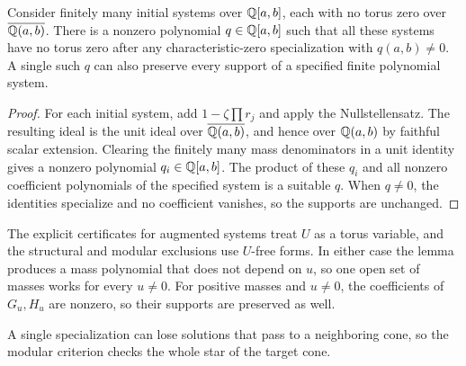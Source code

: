 \documentclass[11pt]{amsart}
\theoremstyle{definition}\newtheorem{definition}[theorem]{Definition}\theoremstyle{remark}\newtheorem{remark}[theorem]{Remark}
\begin{document}
\begin{lemma}\label{lem:spread}
Consider finitely many initial systems over $\mathbb{Q}[a,b]$, each with no torus zero over $\overline{\mathbb{Q}(a,b)}$. There is a nonzero polynomial $q\in\mathbb{Q}[a,b]$ such that all these systems have no torus zero after any characteristic-zero specialization with $q(a,b)\ne0$. A single such $q$ can also preserve every support of a specified finite polynomial system.
\end{lemma}
\begin{proof}
For each initial system, add $1-\zeta\prod r_j$ and apply the Nullstellensatz. The resulting ideal is the unit ideal over $\overline{\mathbb{Q}(a,b)}$, and hence over $\mathbb{Q}(a,b)$ by faithful scalar extension. Clearing the finitely many mass denominators in a unit identity gives a nonzero polynomial $q_i\in\mathbb{Q}[a,b]$. The product of these $q_i$ and all nonzero coefficient polynomials of the specified system is a suitable $q$. When $q\ne0$, the identities specialize and no coefficient vanishes, so the supports are unchanged. \end{proof}
The explicit certificates for augmented systems treat $U$ as a torus variable, and the structural and modular exclusions use $U$-free forms. In either case the lemma produces a mass polynomial that does not depend on $u$, so one open set of masses works for every $u\ne0$. For positive masses and $u\ne0$, the coefficients of $G_u,H_u$ are nonzero, so their supports are preserved as well.

A single specialization can lose solutions that pass to a neighboring cone, so the modular criterion checks the whole star of the target cone.
\end{document}
